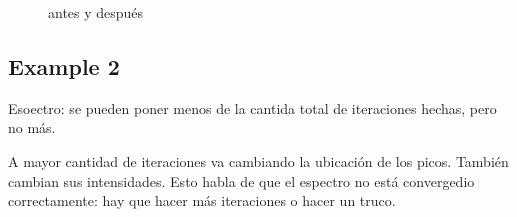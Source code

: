   \begin{figure}[H]
      \centering
      \caption{antes y después}
  \end{figure}

\subsection{Example 2}

  Esoectro: se pueden poner menos de la cantida total de iteraciones hechas, pero no más.

  A mayor cantidad de iteraciones va cambiando la ubicación de los picos. También cambian sus intensidades. Esto habla de que el espectro no está convergedio correctamente: hay que hacer más iteraciones o hacer un truco.

